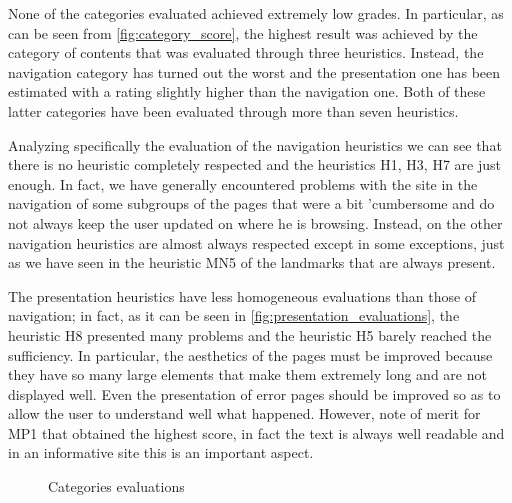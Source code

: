 \documentclass[11pt, letterpaper]{article}
\begin{document}
None of the categories evaluated achieved extremely low grades. In particular, as can be seen from \ref{fig:category_score}, the highest result was achieved by the category of contents that was evaluated through three heuristics. Instead, the navigation category has turned out the worst and the presentation one has been estimated with a rating slightly higher than the navigation one. Both of these latter categories have been evaluated through more than seven heuristics.

Analyzing specifically the evaluation of the navigation heuristics we can see that there is no heuristic completely respected and the heuristics H1, H3, H7 are just enough. In fact, we have generally encountered problems with the site in the navigation of some subgroups of the pages that were a bit 'cumbersome and do not always keep the user updated on where he is browsing. Instead, on the other navigation heuristics are almost always respected except in some exceptions, just as we have seen in the heuristic MN5 of the landmarks that are always present.

The presentation heuristics have less homogeneous evaluations than those of navigation; in fact, as it can be seen in \ref{fig:presentation_evaluations}, the heuristic H8 presented many problems and the heuristic H5 barely reached the sufficiency. In particular, the aesthetics of the pages must be improved because they have so many large elements that make them extremely long and are not displayed well. Even the presentation of error pages should be improved so as to allow the user to understand well what happened. However, note of merit for MP1 that obtained the highest score, in fact the text is always well readable and in an informative site this is an important aspect.

\begin{figure}[H]
    \centering
    \caption{Categories evaluations}
\end{figure}
\end{document}

